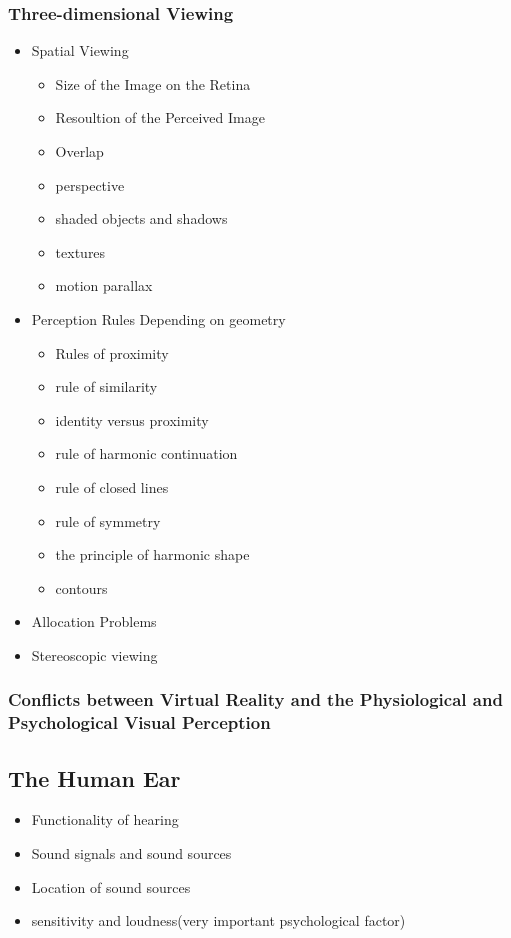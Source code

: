 \documentclass{standalone}
\begin{document}
\subsubsection{Three-dimensional Viewing}
\begin{itemize}
	\item Spatial Viewing
	\begin{itemize}
		\item Size of the Image on the Retina
		\item Resoultion of the Perceived Image
		\item Overlap
		\item perspective
		\item shaded objects and shadows
		\item textures
		\item motion parallax
	\end{itemize}
	\item Perception Rules Depending on geometry
	\begin{itemize}
		\item Rules of proximity
		\item rule of similarity
		\item identity versus proximity
		\item rule of harmonic continuation
		\item rule of closed lines
		\item rule of symmetry
		\item the principle of harmonic shape
		\item contours
	\end{itemize}
	\item Allocation Problems
	\item Stereoscopic viewing
\end{itemize}
\subsubsection{Conflicts between Virtual Reality and the Physiological and Psychological Visual Perception}
\subsection{The Human Ear}
\begin{itemize}
	\item Functionality of hearing
	\item Sound signals and sound sources
	\item Location of sound sources
	\item sensitivity and loudness(very important psychological factor)
\end{itemize}
\end{document}
